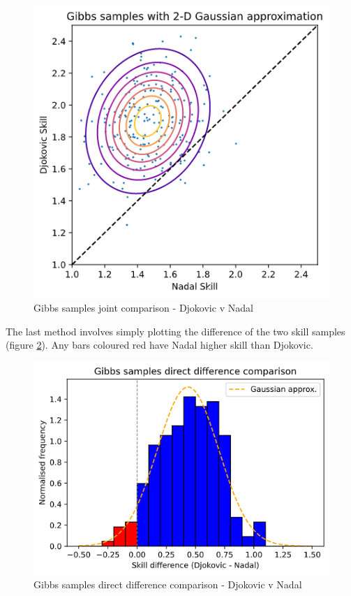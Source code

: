 \documentclass[]{article}
\newcommand{\figwidth}{0.6\linewidth}
\begin{document}
\begin{figure}[!h]
	\centering
	\includegraphics[width=\figwidth]{djokovic-nadal-joint.png}
	\caption{Gibbs samples joint comparison - Djokovic v Nadal}
	\label{fig:djok-nadal-joint}
\end{figure}

The last method involves simply plotting the difference of the two skill samples (figure \ref{fig:djok-nadal-diff}). Any bars coloured red have Nadal higher skill than Djokovic.

\begin{figure}[!h]
	\centering
	\includegraphics[width=\figwidth]{djokovic-nadal-diff.png}
	\caption{Gibbs samples direct difference comparison - Djokovic v Nadal}
	\label{fig:djok-nadal-diff}
\end{figure}
\end{document}
